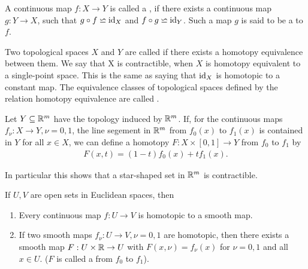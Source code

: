 \begin{definition}\label{def:6-4}
  A continuous map $f:X\to Y$ is called a , if
there exists a continuous map $g:Y\to X$, such that $g\circ f \backsimeq \operatorname{id}_X$ and $f\circ g\backsimeq \operatorname{id}_Y$.
Such a map $g$ is said to be a  to $f$.
\end{definition}

Two topological spaces $X$ and $Y$ are called  if there exists a
homotopy equivalence between them. We say that X is contractible, when $X$ is
homotopy equivalent to a single-point space. This is the same as saying that $\operatorname{id}_X$
is homotopic to a constant map. The equivalence classes of topological spaces
defined by the relation homotopy equivalence are called .

\begin{example}\label{example:6-5}
Let $Y\subseteq\mathbb{R}^m$ have the topology induced by $\mathbb{R}^m$. If, for the continuous maps $f_\nu:X\to Y, \nu=0, 1$, the line segement
in $\mathbb{R}^m$ from $f_0(x)$ to $f_1(x)$ is contained in $Y$ for all $x\in X$, we can define a homotopy $F:X\times [0, 1]\to Y$  from 
$f_0$ to $f_1$ by 
\begin{align*}
  F(x, t) = (1-t)f_0(x) + tf_1(x).
\end{align*}

In particular this shows that a star-shaped set in $\mathbb{R}^m$ is contractible.
\end{example}


\begin{lemma}\label{lemma:6-6}
If $U, V$ are open sets in Euclidean spaces, then 
\begin{enumerate}[label=(\roman*)]
  \item Every continuous map $f:U\to V$ is homotopic to a smooth map.
  \item If two smooth maps $f_\nu:U\to V, \nu=0, 1$ are homotopic, then there exists a smooth map $F:U\times\mathbb{R}\to U$ with 
    $F(x, \nu) = f_\nu(x)$ for $\nu=0, 1$ and all $x\in U$. ($F$  is called a  from $f_0$ to $f_1$).
\end{enumerate}
\end{lemma}

